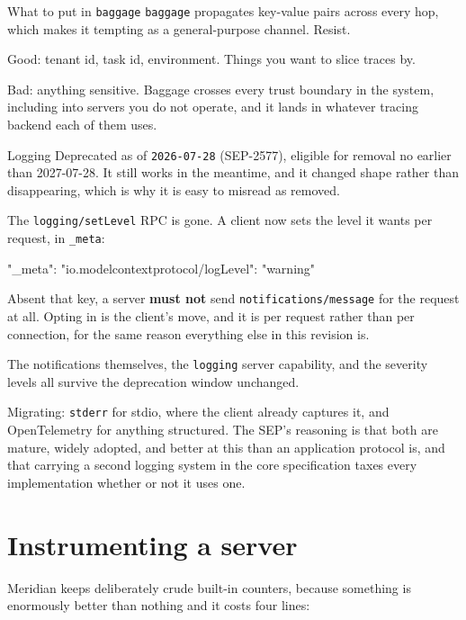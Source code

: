 \begin{notebox}{What to put in \texttt{baggage}}
\texttt{baggage} propagates key-value pairs across every hop, which makes it
tempting as a general-purpose channel. Resist.

Good: tenant id, task id, environment. Things you want to slice traces by.

Bad: anything sensitive. Baggage crosses every trust boundary in the system,
including into servers you do not operate, and it lands in whatever tracing
backend each of them uses.
\end{notebox}

\begin{legacybox}{Logging}
Deprecated as of \texttt{2026-07-28} (SEP-2577), eligible for removal no earlier
than 2027-07-28. It still works in the meantime, and it changed shape rather
than disappearing, which is why it is easy to misread as removed.

The \texttt{logging/setLevel} RPC is gone. A client now sets the level it wants
per request, in \texttt{\_meta}:

\begin{wire}
"_meta": { "io.modelcontextprotocol/logLevel": "warning" }
\end{wire}

Absent that key, a server \textbf{must not} send \texttt{notifications/message}
for the request at all. Opting in is the client's move, and it is per request
rather than per connection, for the same reason everything else in this revision
is.

The notifications themselves, the \texttt{logging} server capability, and the
severity levels all survive the deprecation window unchanged.

Migrating: \texttt{stderr} for stdio, where the client already captures it, and
OpenTelemetry for anything structured. The SEP's reasoning is that both are
mature, widely adopted, and better at this than an application protocol is, and
that carrying a second logging system in the core specification taxes every
implementation whether or not it uses one.
\end{legacybox}

\section{Instrumenting a server}

Meridian keeps deliberately crude built-in counters, because something is
enormously better than nothing and it costs four lines:

